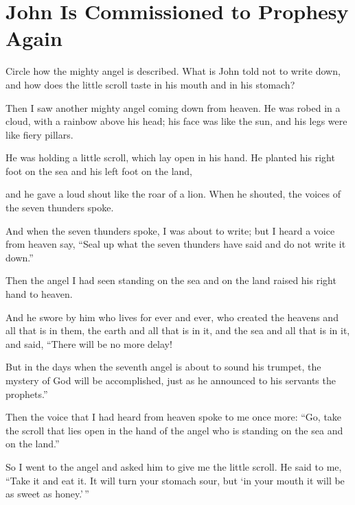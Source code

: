 \section{John Is Commissioned to Prophesy Again}
\begin{ScriptureBox2}{Circle how the mighty angel is described. What is John told not to write down, and how does the little scroll taste in his mouth and in his stomach?}

\item[10:1] Then I saw another mighty angel coming down from heaven. He was robed in a cloud, with a rainbow above his head; his face was like the sun, and his legs were like fiery pillars.

\item[10:2] He was holding a little scroll, which lay open in his hand. He planted his right foot on the sea and his left foot on the land,

\item[10:3] and he gave a loud shout like the roar of a lion. When he shouted, the voices of the seven thunders spoke.

\item[10:4] And when the seven thunders spoke, I was about to write; but I heard a voice from heaven say, ``Seal up what the seven thunders have said and do not write it down.''

\item[10:5] Then the angel I had seen standing on the sea and on the land raised his right hand to heaven.

\item[10:6] And he swore by him who lives for ever and ever, who created the heavens and all that is in them, the earth and all that is in it, and the sea and all that is in it, and said, ``There will be no more delay!

\item[10:7] But in the days when the seventh angel is about to sound his trumpet, the mystery of God will be accomplished, just as he announced to his servants the prophets.''

\item[10:8] Then the voice that I had heard from heaven spoke to me once more: ``Go, take the scroll that lies open in the hand of the angel who is standing on the sea and on the land.''

\item[10:9] So I went to the angel and asked him to give me the little scroll. He said to me, ``Take it and eat it. It will turn your stomach sour, but `in your mouth it will be as sweet as honey.'\,''


\end{ScriptureBox2}
